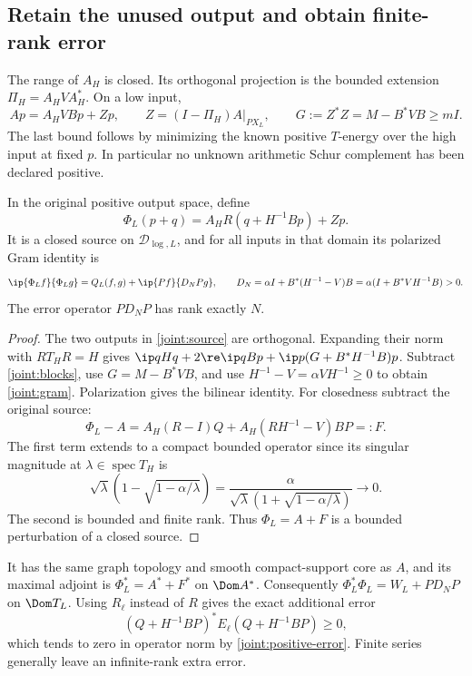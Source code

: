 \subsection{Retain the unused output and obtain finite-rank error}
The range of $A_H$ is closed. Its orthogonal projection is the
bounded extension $\Pi_H=A_HVA_H^*$. On a low input,
\[
Ap=A_HVBp+Zp,\qquad
Z=(I-\Pi_H)A|_{PX_L},\qquad
G:=Z^*Z=M-B^*VB\ge mI.
\]
The last bound follows by minimizing the known positive $T$-energy
over the high input at fixed $p$. In particular no unknown
arithmetic Schur complement has been declared positive.

\begin{theorem}\label{joint:completion}
In the original positive output space, define
\begin{equation}\label{joint:source}
\Phi_L(p+q)=A_HR(q+H^{-1}Bp)+Zp .
\end{equation}
It is a closed source on $\mathcal D_{\log,L}$, and for all
inputs in that domain its polarized Gram identity is
\begin{equation}\label{joint:gram}
\ip{\Phi_Lf}{\Phi_Lg}=Q_L(f,g)+\ip{Pf}{D_NPg},
\qquad
D_N=\alpha I+B^*(H^{-1}-V)B
    =\alpha(I+B^*VH^{-1}B)>0.
\end{equation}
The error operator $PD_NP$ has rank exactly $N$.
\end{theorem}
\begin{proof}
The two outputs in \eqref{joint:source} are orthogonal. Expanding
their norm with $RT_HR=H$ gives
$\ip q{Hq}+2\re\ip q{Bp}
+\ip p{(G+B^*H^{-1}B)p}$.
Subtract \eqref{joint:blocks}, use $G=M-B^*VB$, and use
$H^{-1}-V=\alpha VH^{-1}\ge0$ to obtain \eqref{joint:gram}.
Polarization gives the bilinear identity.
For closedness subtract the original source:
\begin{equation}\label{joint:correction}
\Phi_L-A=A_H(R-I)Q+
                 A_H(RH^{-1}-V)BP=:F.
\end{equation}
The first term extends to a compact bounded operator since its
singular magnitude at $\lambda\in\operatorname{spec}T_H$ is
\[
\sqrt\lambda(1-\sqrt{1-\alpha/\lambda})
 =\frac{\alpha}{\sqrt\lambda(1+\sqrt{1-\alpha/\lambda})}
 \longrightarrow0.
\]
The second is bounded and finite rank. Thus $\Phi_L=A+F$ is a
bounded perturbation of a closed source.
\end{proof}

It has the same graph topology and smooth compact-support core
as $A$, and its maximal adjoint is
$\Phi_L^*=A^*+F^*$ on $\Dom A^*$.
Consequently
$\Phi_L^*\Phi_L=W_L+PD_NP$ on $\Dom T_L$.
Using $R_\ell$ instead of $R$ gives the exact additional error
\[
(Q+H^{-1}BP)^*E_\ell(Q+H^{-1}BP)\ge0,
\]
which tends to zero in operator norm by
\eqref{joint:positive-error}.
Finite series generally leave an infinite-rank extra error.

